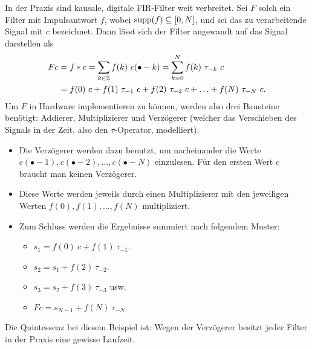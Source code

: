 \begin{example}
In der Praxis sind kausale, digitale FIR-Filter weit verbreitet. Sei $ F $ solch ein Filter mit
Impulsantwort $ f $, wobei $ \operatorname{supp}(f) \subseteq [0, N] $, und sei das zu verarbeitende Signal mit
$ c $ bezeichnet. Dann lässt sich der Filter angewandt auf das Signal darstellen als
\begin{align*}
  Fc &= f * c = \sum_{k \in \mathbb{Z}}f(k) \ c(\bullet - k) = \sum_{k = 0}^{N} f(k) \ \tau_{-k} \ c \\
     &= f(0) \ c + f(1) \ \tau_{-1} \ c + f(2) \ \tau_{-2} \ c + \ldots + f(N) \ \tau_{-N} \ c.
\end{align*}
Um $ F $ in Hardware implementieren zu können, werden also drei Bausteine benötigt: Addierer,
Multiplizierer und Verzögerer (welcher das Verschieben des Signals in der Zeit, also den
$ \tau $-Operator, modelliert).
\begin{itemize}
\item Die Verzögerer werden dazu benutzt, um nacheinander die Werte
  $ c(\bullet - 1), c(\bullet - 2), \ldots, c(\bullet - N) $ einzulesen. Für den ersten Wert $ c $ 
  braucht man keinen Verzögerer.
\item Diese Werte werden jeweils durch einen Multiplizierer mit den jeweiligen Werten
  $ f(0), f(1), \ldots, f(N) $ multipliziert.
\item Zum Schluss werden die Ergebnisse summiert nach folgendem Muster:
  \begin{itemize}
  \item $ s_{1} = f(0) \ c + f(1) \ \tau_{-1} $.
  \item $ s_{2} = s_{1} + f(2) \ \tau_{-2} $.
  \item $ s_{3} = s_{2} + f(3) \ \tau_{-3} $ usw.
  \item $ Fc = s_{N-1} + f(N) \ \tau_{-N} $.
  \end{itemize}
\end{itemize}

Die Quintessenz bei diesem Beispiel ist: Wegen der Verzögerer besitzt jeder Filter in der Praxis
eine gewisse Laufzeit.
\end{example}

